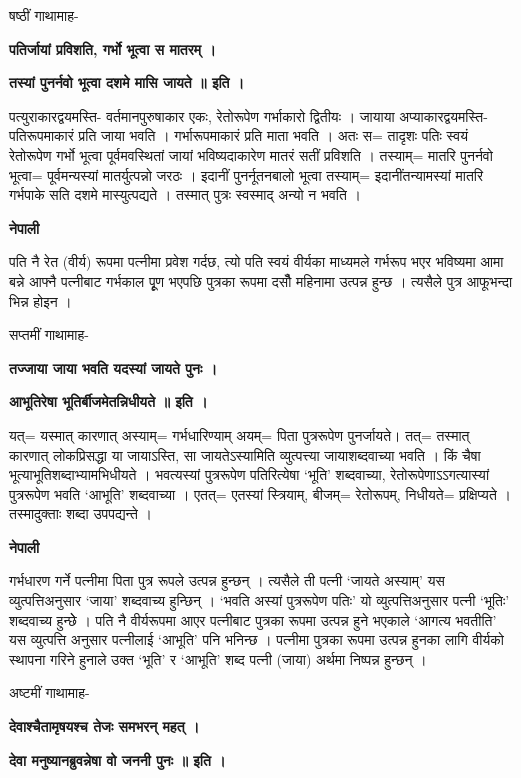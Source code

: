 \documentclass[11pt, a5paper]{article}
\begin{document}
षष्ठीं गाथामाह-

\textbf{पतिर्जायां प्रविशति, गर्भो भूत्वा स मातरम् ।}

\textbf{तस्यां पुनर्नवो भूत्वा दशमे मासि जायते ॥ इति ।}

पत्युराकारद्वयमस्ति- वर्तमानपुरुषाकार एकः, रेतोरूपेण गर्भाकारो द्वितीयः । जायाया अप्याकारद्वयमस्ति-  पतिरूपमाकारं प्रति जाया भवति । गर्भारूपमाकारं प्रति माता भवति । अतः स= तादृशः पतिः स्वयं रेतोरूपेण गर्भो भूत्वा पूर्वमवस्थितां जायां भविष्यदाकारेण मातरं सतीं प्रविशति । तस्याम्= मातरि पुनर्नवो भूत्वा= पूर्वमन्यस्यां मातर्युत्पन्नो जरठः । इदानीं पुनर्नूतनबालो भूत्वा तस्याम्= इदानींतन्यामस्यां मातरि गर्भपाके सति दशमे मास्युत्पद्यते । तस्मात् पुत्रः स्वस्माद् अन्यो न भवति ।

\textbf{नेपाली}

पति नै रेत (वीर्य) रूपमा पत्नीमा प्रवेश गर्दछ, त्यो पति स्वयं वीर्यका माध्यमले गर्भरूप भएर भविष्यमा आमा बन्ने आफ्नै पत्नीबाट गर्भकाल पूृण भएपछि पुत्रका रूपमा दसौँ महिनामा उत्पन्न हुन्छ । त्यसैले पुत्र आफूभन्दा भिन्न होइन ।

सप्तमीं गाथामाह-

\textbf{तज्जाया जाया भवति यदस्यां जायते पुनः ।}

\textbf{आभूतिरेषा भूतिर्बीजमेतन्निधीयते ॥ इति ।}

यत्= यस्मात् कारणात् अस्याम्= गर्भधारिण्याम् अयम्= पिता पुत्ररूपेण पुनर्जायते। तत्= तस्मात् कारणात् लोकप्रिसद्धा या जायाऽस्ति, सा जायतेऽस्यामिति व्युत्पत्त्या जायाशब्दवाच्या भवति । किं चैषा भूत्याभूतिशब्दाभ्यामभिधीयते । भवत्यस्यां पुत्ररूपेण पतिरित्येषा ‘भूति’ शब्दवाच्या, रेतोरूपेणाऽऽगत्यास्यां पुत्ररूपेण भवति ‘आभूति’ शब्दवाच्या । एतत्= एतस्यां स्त्रियाम्, बीजम्= रेतोरूपम्, निधीयते= प्रक्षिप्यते । तस्मादुक्ताः शब्दा उपपद्यन्ते ।

\textbf{नेपाली}

गर्भधारण गर्ने पत्नीमा पिता पुत्र रूपले उत्पन्न हुन्छन् । त्यसैले ती पत्नी ‘जायते अस्याम्’ यस व्युत्पत्तिअनुसार ‘जाया’ शब्दवाच्य हुन्छिन् । ‘भवति अस्यां पुत्ररूपेण पतिः’ यो व्युत्पत्तिअनुसार पत्नी ‘भूतिः’ शब्दवाच्य हुन्छेे । पति नै वीर्यरूपमा आएर पत्नीबाट पुत्रका रूपमा उत्पन्न हुने भएकाले ‘आगत्य भवतीति’ यस व्युत्पत्ति अनुसार पत्नीलाई ‘आभूति’ पनि भनिन्छ । पत्नीमा पुत्रका रूपमा उत्पन्न हुनका लागि वीर्यको स्थापना गरिने हुनाले उक्त ‘भूति’ र ‘आभूति’ शब्द पत्नी (जाया) अर्थमा निष्पन्न हुन्छन् ।

अष्टमीं गाथामाह-

\textbf{देवाश्चैतामृषयश्च तेजः समभरन् महत् ।}

\textbf{देवा मनुष्यानब्रुवन्नेषा वो जननी पुनः ॥ इति ।}
\end{document}

